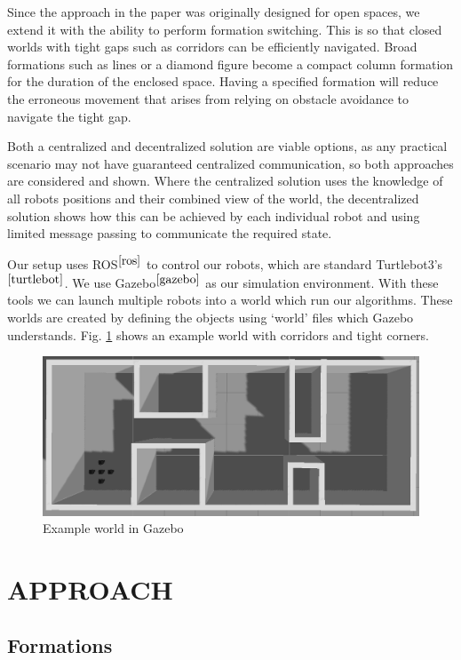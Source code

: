 \documentclass[letterpaper, 10 pt, conference]{ieeeconf}  %
\begin{document}
Since the approach in the paper was originally designed for open spaces, we extend it with the ability to perform formation switching. This is so that closed worlds with tight gaps such as corridors can be efficiently navigated. Broad formations such as lines or a diamond figure become a compact column formation for the duration of the enclosed space. Having a specified formation will reduce the erroneous movement that arises from relying on obstacle avoidance to navigate the tight gap.

Both a centralized and decentralized solution are viable options, as any practical scenario may not have guaranteed centralized communication, so both approaches are considered and shown. Where the centralized solution uses the knowledge of all robots positions and their combined view of the world, the decentralized solution shows how this can be achieved by each individual robot and using limited message passing to communicate the required state.

Our setup uses ROS$^{\cite{ros}}$ to control our robots, which are standard Turtlebot3's$^{\cite{turtlebot}}$. We use Gazebo$^{\cite{gazebo}}$ as our simulation environment. With these tools we can launch multiple robots into a world which run our algorithms. These worlds are created by defining the objects using `world' files which Gazebo understands. Fig. \ref{corridorworld} shows an example world with corridors and tight corners.

\begin{figure}[thpb]
\centering
\includegraphics[width=\linewidth]{corridorworld}
\caption{Example world in Gazebo}
\label{corridorworld}
\end{figure}

\section{APPROACH}

\subsection{Formations}
\label{formationsubsection}
\end{document}
